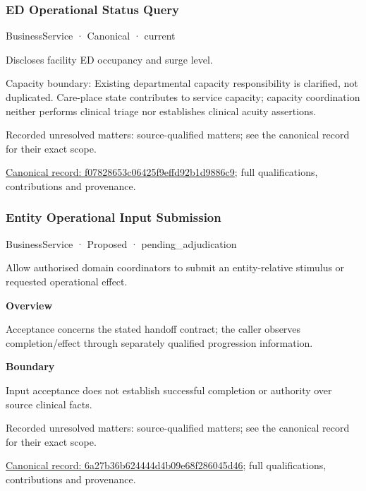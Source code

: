\subsubsection{ED Operational Status Query}

\label{element:f07828653c06425f9effd92b1d9886c9}
{\small BusinessService · Canonical · current}\par

Discloses facility ED occupancy and surge level.



Capacity boundary: Existing departmental capacity responsibility is clarified, not duplicated. Care-place state contributes to service capacity; capacity coordination neither performs clinical triage nor establishes clinical acuity assertions.


{\small Recorded unresolved matters: source-qualified matters; see the canonical record for their exact scope.}\par
{\footnotesize \href{../../../../continuum/business/business-service/f07828653c06425f9effd92b1d9886c9.md}{Canonical record: f07828653c06425f9effd92b1d9886c9}; full qualifications, contributions and provenance.}\par
\subsubsection{Entity Operational Input Submission}

\label{element:6a27b36b624444d4b09e68f286045d46}
{\small BusinessService · Proposed · pending\_adjudication}\par

Allow authorised domain coordinators to submit an entity-relative stimulus or requested operational effect.



\textbf{Overview}



Acceptance concerns the stated handoff contract; the caller observes completion/effect through separately qualified progression information.



\textbf{Boundary}



Input acceptance does not establish successful completion or authority over source clinical facts.


{\small Recorded unresolved matters: source-qualified matters; see the canonical record for their exact scope.}\par
{\footnotesize \href{../../../../continuum/business/business-service/6a27b36b624444d4b09e68f286045d46.md}{Canonical record: 6a27b36b624444d4b09e68f286045d46}; full qualifications, contributions and provenance.}\par
